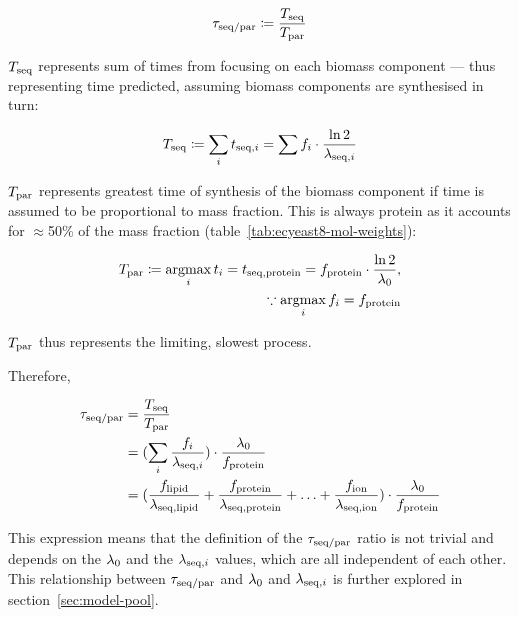 \begin{equation}
  \tau_{\mathrm{seq}/\mathrm{par}} \coloneqq \frac{T_{\mathrm{seq}}}{T_{\mathrm{par}}}
  \label{eq:model-ratio-simplified}
\end{equation}

$T_{\mathrm{seq}}$ represents sum of times from focusing on each biomass component --- thus representing time predicted, assuming biomass components are synthesised in turn:

\begin{equation}
  T_{\mathrm{seq}} \coloneqq \sum_{i} t_{\mathrm{seq},i} = \sum f_{i} \cdot \frac{\ln 2}{\lambda_{\mathrm{seq},i}}
  \label{eq:model-a}
\end{equation}

$T_{\mathrm{par}}$ represents greatest time of synthesis of the biomass component if time is assumed to be proportional to mass fraction.
This is always protein as it accounts for $\approx$50\% of the mass fraction (table~\ref{tab:ecyeast8-mol-weights}):

\begin{equation}
  \begin{aligned}
    T_{\mathrm{par}} \coloneqq \operatorname*{argmax}_{i} t_{i} = t_{\mathrm{seq},\mathrm{protein}} = f_{\mathrm{protein}} \cdot \frac{\ln 2}{\lambda_{0}},\\
    \because \operatorname*{argmax}_{i} f_{i} = f_{\mathrm{protein}}
  \end{aligned}
  \label{eq:model-b}
\end{equation}

$T_{\mathrm{par}}$ thus represents the limiting, slowest process.

Therefore,

\begin{equation}
  \begin{aligned}
    \tau_{\mathrm{seq}/\mathrm{par}} &= \frac{T_{\mathrm{seq}}}{T_{\mathrm{par}}} \\
    & = (\sum_i \frac{f_i}{\lambda_{\mathrm{seq},i}}) \cdot \frac{\lambda_{0}}{f_{\mathrm{protein}}} \\
    & = (\frac{f_{\mathrm{lipid}}}{\lambda_{\mathrm{seq},\mathrm{lipid}}} + \frac{f_{\mathrm{protein}}}{\lambda_{\mathrm{seq},\mathrm{protein}}} + \ldots + \frac{f_{\mathrm{ion}}}{\lambda_{\mathrm{seq},\mathrm{ion}}}) \cdot \frac{\lambda_{0}}{f_{\mathrm{protein}}}
    \end{aligned}
  \label{eq:model-ratio}
\end{equation}

This expression means that the definition of the $\tau_{\mathrm{seq}/\mathrm{par}}$ ratio is not trivial and depends on the $\lambda_{0}$ and the $\lambda_{\mathrm{seq},i}$ values, which are all independent of each other.
This relationship between $\tau_{\mathrm{seq}/\mathrm{par}}$ and $\lambda_{0}$ and $\lambda_{\mathrm{seq},i}$ is further explored in section~\ref{sec:model-pool}.

